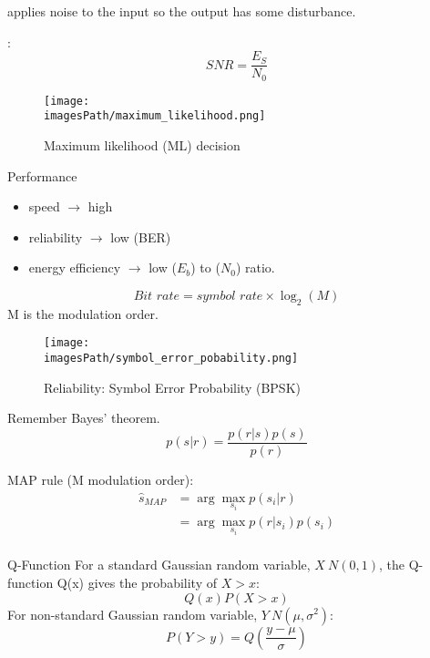  applies noise to the input so the output has some disturbance.

:
\begin{equation}
    SNR = \frac{E_S}{N_0}
\end{equation}

\begin{figure}[H]
    \centering
    \texttt{[image: \\imagesPath/maximum\_likelihood.png]}
    \caption{Maximum likelihood (ML) decision}
\end{figure}

Performance
\begin{itemize}
    \item speed $\rightarrow$ high 
    \item reliability $\rightarrow$ low  (BER)
    \item energy efficiency $\rightarrow$ low  ($E_b$) to  ($N_0$) ratio.
\end{itemize}

\begin{equation}
    \textit{Bit rate} = \textit{symbol rate} \times \log_2(M)
\end{equation}
M is the modulation order.

\begin{figure}[H]
    \centering
    \texttt{[image: \\imagesPath/symbol\_error\_pobability.png]}
    \caption{Reliability: Symbol Error Probability (BPSK)}
\end{figure}

Remember Bayes' theorem.
\begin{equation}
    p(s|r) = \frac{p(r|s)p(s)}{p(r)}
\end{equation}


MAP rule (M modulation order):
\begin{align*}
    \hat{s}_{MAP} &= \arg\max_{s_i} p(s_i|r) \\
                  &= \arg\max_{s_i} p(r|s_i)p(s_i) \\
\end{align*}

\begin{definitionblock}{Q-Function} 
    For a standard Gaussian random variable, $X ~ N(0,1)$, the Q-function  
    Q(x) gives the probability of $X>x$:
    \begin{equation}
        Q(x)  P (X>x)
    \end{equation}
    For non-standard Gaussian random variable, $Y~N(\mu, \sigma^2)$:
    \begin{equation}
        P(Y>y) = Q(\frac{y-\mu}{\sigma})
    \end{equation}
\end{definitionblock}


